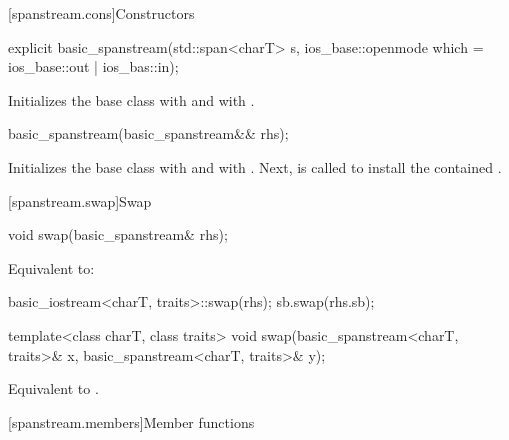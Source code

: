 [spanstream.cons]{Constructors}

%
\begin{itemdecl}
explicit basic_spanstream(std::span<charT> s,
                          ios_base::openmode which = ios_base::out | ios_bas::in);
\end{itemdecl}

\begin{itemdescr}
\pnum
\effects
Initializes the base class with
and  with
.
\end{itemdescr}

%
\begin{itemdecl}
basic_spanstream(basic_spanstream&& rhs);
\end{itemdecl}

\begin{itemdescr}
\pnum
\effects
Initializes the base class with 
and  with .
Next, 
is called to install the contained .
\end{itemdescr}

[spanstream.swap]{Swap}

%
\begin{itemdecl}
void swap(basic_spanstream& rhs);
\end{itemdecl}

\begin{itemdescr}
\pnum
\effects
Equivalent to:
\begin{codeblock}
basic_iostream<charT, traits>::swap(rhs);
sb.swap(rhs.sb);
\end{codeblock}
\end{itemdescr}

%
\begin{itemdecl}
template<class charT, class traits>
  void swap(basic_spanstream<charT, traits>& x, basic_spanstream<charT, traits>& y);
\end{itemdecl}

\begin{itemdescr}
\pnum
\effects
Equivalent to .
\end{itemdescr}

[spanstream.members]{Member functions}

